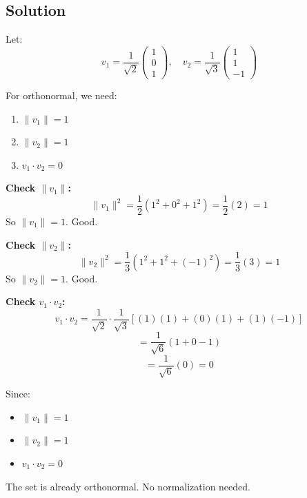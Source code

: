 \subsection*{Solution}

Let:
\[
v_1 = \frac{1}{\sqrt{2}} \begin{pmatrix} 1 \\ 0 \\ 1 \end{pmatrix}, \quad v_2 = \frac{1}{\sqrt{3}} \begin{pmatrix} 1 \\ 1 \\ -1 \end{pmatrix}
\]

For orthonormal, we need:
\begin{enumerate}
\item $\|v_1\| = 1$
\item $\|v_2\| = 1$
\item $v_1 \cdot v_2 = 0$
\end{enumerate}

\textbf{Check $\|v_1\|$:}
\[
\|v_1\|^2 = \frac{1}{2}(1^2 + 0^2 + 1^2) = \frac{1}{2}(2) = 1
\]
So $\|v_1\| = 1$. Good.

\textbf{Check $\|v_2\|$:}
\[
\|v_2\|^2 = \frac{1}{3}(1^2 + 1^2 + (-1)^2) = \frac{1}{3}(3) = 1
\]
So $\|v_2\| = 1$. Good.

\textbf{Check $v_1 \cdot v_2$:}
\[
v_1 \cdot v_2 = \frac{1}{\sqrt{2}} \cdot \frac{1}{\sqrt{3}} \left[ (1)(1) + (0)(1) + (1)(-1) \right]
\]
\[
= \frac{1}{\sqrt{6}} (1 + 0 - 1)
\]
\[
= \frac{1}{\sqrt{6}} (0) = 0
\]

Since:
\begin{itemize}
\item $\|v_1\| = 1$
\item $\|v_2\| = 1$
\item $v_1 \cdot v_2 = 0$
\end{itemize}

The set is already orthonormal. No normalization needed.
